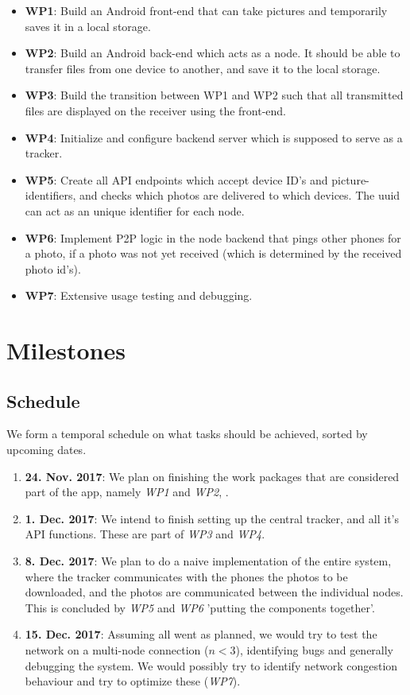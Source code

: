 \documentclass{report}
\begin{document}
\begin{itemize}
        \item {\bf WP1}:  Build an Android front-end that can take pictures and temporarily saves it in a local storage.    
        \item {\bf WP2}:  Build an Android back-end which acts as a node. 
        It should be able to transfer files from one device to another, and save it to the local storage.
        \item {\bf WP3}: Build the transition between WP1 and WP2 such that all transmitted files are displayed on the receiver using the front-end.    
        \item {\bf WP4}: Initialize and configure backend server which is supposed to serve as a tracker.    
        \item {\bf WP5}: Create all API endpoints which accept device ID's and picture-identifiers, and checks which photos are delivered to which devices. 
        The uuid can act as an unique identifier for each node.    
        \item {\bf WP6}: Implement P2P logic in the node backend that pings other phones for a photo, if a photo was not yet received (which is determined by the received photo id's). 
        \item {\bf WP7}: Extensive usage testing and debugging.
\end{itemize}
 
\section{Milestones}


\subsection{Schedule}
We form a temporal schedule on what tasks should be achieved, sorted by upcoming dates.
\begin{enumerate}
\item  \textbf{24. Nov. 2017}: We plan on finishing the work packages that are considered part of the app, namely \textit{WP1} and \textit{WP2}, .
\item  \textbf{1. Dec. 2017}: We intend to finish setting up the central tracker, and all it's API functions. These are part of \textit{WP3} and \textit{WP4}.
\item \textbf{8. Dec. 2017}: We plan to do a naive implementation of the entire system, where the tracker communicates with the phones the photos to be downloaded, and the photos are communicated between the individual nodes. This is concluded by \textit{WP5} and  \textit{WP6} 'putting the components together'.
\item \textbf{15. Dec. 2017}: Assuming all went as planned, we would try to test the network on a multi-node connection ($n < 3$), identifying bugs and generally debugging the system. 
We would possibly try to identify network congestion behaviour and try to optimize these (\textit{WP7}).
\end{enumerate}
\end{document}
